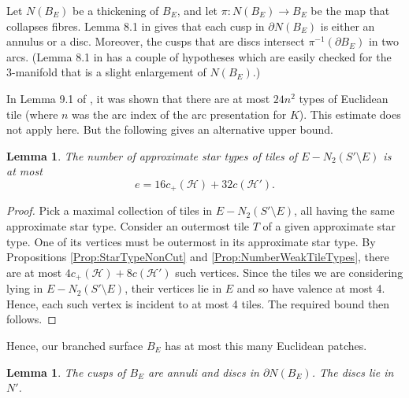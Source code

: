 \documentclass[oneside]{amsart}
\numberwithin{equation}{section}
\theoremstyle{plain}
\newtheorem{lemma}[equation]{Lemma}
\theoremstyle{definition}
\begin{document}
Let $N(B_E)$ be a thickening of $B_E$, and let $\pi \colon N(B_E) \rightarrow B_E$ be the map that
collapses fibres. Lemma 8.1 in \cite{Lackenby:PolyUnknot} gives that each cusp in $\partial N(B_E)$ is either an annulus or a disc.
Moreover, the cusps that are discs intersect $\pi^{-1}(\partial B_E)$ in two arcs. (Lemma 8.1 in 
\cite{Lackenby:PolyUnknot} has a couple of hypotheses which are easily checked for the 3-manifold that is a slight enlargement of $N(B_E)$.)


In Lemma 9.1 of  \cite{Lackenby:PolyUnknot}, it was shown that there are at most $24n^2$ types of Euclidean tile (where $n$ was
the arc index of the arc presentation for $K$). This estimate does not apply here. But the following gives an alternative
upper bound.

\begin{lemma}
The number of approximate star types of tiles of $E - N_2(S' \setminus E)$ is at most 
$$e = 16c_+(\mathcal{H}) + 32c(\mathcal{H}').$$
\end{lemma}

\begin{proof}
Pick a maximal collection of tiles in $E - N_2(S' \setminus E)$, all having the same approximate star type. Consider an outermost tile $T$ of a given approximate star type. One of its vertices must be outermost in its approximate star type.
By Propositions \ref{Prop:StarTypeNonCut} and \ref{Prop:NumberWeakTileTypes}, there are at most $4c_+(\mathcal{H}) + 8c(\mathcal{H}')$ such vertices. Since the tiles we
are considering lying in $E - N_2(S' \setminus E)$, their vertices lie in $E$ and so have valence at most 4. Hence, each such vertex is incident to at most 4 tiles.
The required bound then follows.
\end{proof}

Hence, our branched surface $B_E$ has at most this
many Euclidean patches.

\begin{lemma}
\label{Lem:CuspTypes}
The cusps of $B_E$ are annuli and discs in $\partial N(B_E)$. The discs lie in $N'$.
\end{lemma}
\end{document}
